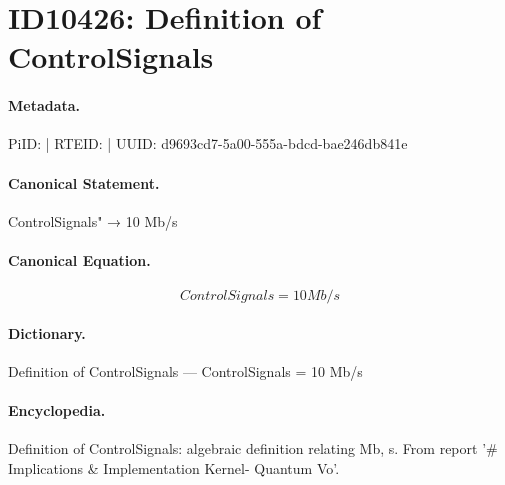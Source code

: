 \section*{ID10426: Definition of ControlSignals}
\paragraph{Metadata.}
PiID:  | RTEID:  | UUID: d9693cd7-5a00-555a-bdcd-bae246db841e

\paragraph{Canonical Statement.}
ControlSignals" → 10 Mb/s

\paragraph{Canonical Equation.}
\[
ControlSignals = 10 Mb/s
\]

\paragraph{Dictionary.}
Definition of ControlSignals — ControlSignals = 10 Mb/s

\paragraph{Encyclopedia.}
Definition of ControlSignals: algebraic definition relating Mb, s. From report '\# Implications \& Implementation Kernel- Quantum Vo'.
